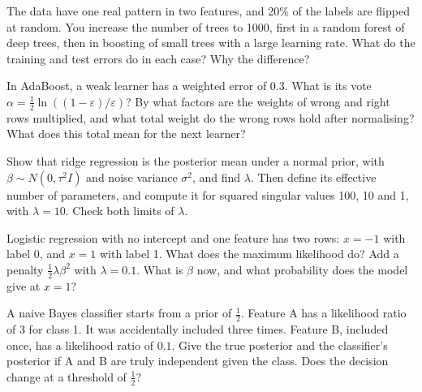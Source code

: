 \begin{question}\label{iq:iv1:machine-learning:16}
The data have one real pattern in two features, and 20\% of the labels are flipped at random. You increase the number of trees to 1000, first in a random forest of deep trees, then in boosting of small trees with a large learning rate. What do the training and test errors do in each case? Why the difference?
\end{question}

\begin{question}\label{iq:iv1:machine-learning:17}
In AdaBoost, a weak learner has a weighted error of $0.3$. What is its vote $\alpha = \frac12\ln((1 - \varepsilon)/\varepsilon)$? By what factors are the weights of wrong and right rows multiplied, and what total weight do the wrong rows hold after normalising? What does this total mean for the next learner?
\end{question}

\begin{question}\label{iq:iv1:machine-learning:18}
Show that ridge regression is the posterior mean under a normal prior, with $\beta \sim N(0, \tau^2 I)$ and noise variance $\sigma^2$, and find $\lambda$. Then define its effective number of parameters, and compute it for squared singular values 100, 10 and 1, with $\lambda = 10$. Check both limits of $\lambda$.
\end{question}

\begin{question}\label{iq:iv1:machine-learning:19}
Logistic regression with no intercept and one feature has two rows: $x = -1$ with label 0, and $x = 1$ with label 1. What does the maximum likelihood do? Add a penalty $\frac12\lambda\beta^2$ with $\lambda = 0.1$. What is $\beta$ now, and what probability does the model give at $x = 1$?
\end{question}

\begin{question}\label{iq:iv1:machine-learning:20}
A naive Bayes classifier starts from a prior of $\frac12$. Feature A has a likelihood ratio of 3 for class 1. It was accidentally included three times. Feature B, included once, has a likelihood ratio of $0.1$. Give the true posterior and the classifier's posterior if A and B are truly independent given the class. Does the decision change at a threshold of $\frac12$?
\end{question}

